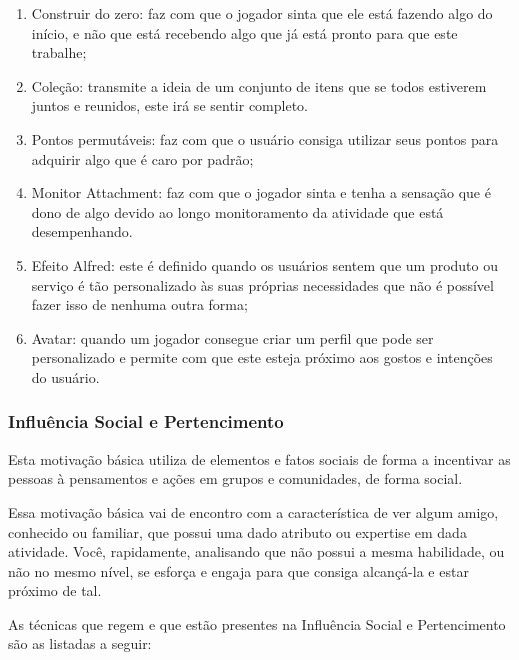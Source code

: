 \begin{enumerate}
    \item Construir do zero: faz com que o jogador sinta que ele está
        fazendo algo do início, e não que está recebendo algo que
        já está pronto para que este trabalhe;
    \item Coleção: transmite a ideia de um conjunto de itens que se todos
        estiverem juntos e reunidos, este irá se sentir completo.
    \item Pontos permutáveis: faz com que o usuário consiga utilizar
        seus pontos para adquirir algo que é caro por padrão;
    \item Monitor Attachment: faz com que o jogador sinta e tenha a
        sensação que é dono de algo devido ao longo monitoramento
        da atividade que está desempenhando.
    \item Efeito Alfred: este é definido quando os usuários
        sentem que um produto ou serviço é tão personalizado às
        suas próprias necessidades que não é possível fazer isso
        de nenhuma outra forma;
    \item Avatar: quando um jogador consegue criar um perfil que pode ser
        personalizado e permite com que este esteja próximo aos gostos e
        intenções do usuário.
\end{enumerate}

\subsubsection{Influência Social e Pertencimento}
\label{sub:influenciasocialepertencimento}
Esta motivação básica utiliza de elementos e fatos sociais de forma
a incentivar as pessoas à pensamentos e ações em grupos e comunidades,
de forma social.

Essa motivação básica vai de encontro com a característica de ver algum
amigo, conhecido ou familiar, que possui uma dado atributo ou expertise
em dada atividade. Você, rapidamente, analisando que não possui a mesma
habilidade, ou não no mesmo nível, se esforça e engaja para que consiga
alcançá-la e estar próximo de tal.

As técnicas que regem e que estão presentes na Influência Social e Pertencimento
são as listadas a seguir:

